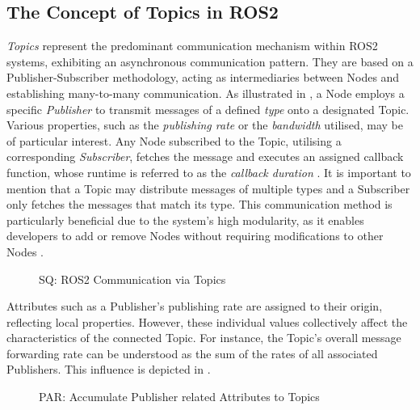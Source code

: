     \subsection{The Concept of Topics in ROS2} \label{subsec:model:topics}
        \emph{Topics} represent the predominant communication mechanism within ROS2 systems, exhibiting an asynchronous communication pattern. They are based on a Publisher-Subscriber methodology, acting as intermediaries between Nodes and establishing many-to-many communication. As illustrated in , a Node employs a specific \emph{Publisher} to transmit messages of a defined \emph{type} onto a designated Topic. Various properties, such as the \emph{publishing rate} or the \emph{bandwidth} utilised, may be of particular interest. Any Node subscribed to the Topic, utilising a corresponding \emph{Subscriber}, fetches the message and executes an assigned callback function, whose runtime is referred to as the \emph{callback duration} \cite[p.~3]{ROS2usesInTheWild}. It is important to mention that a Topic may distribute messages of multiple types and a Subscriber only fetches the messages that match its type.\newline
        This communication method is particularly beneficial due to the system's high modularity, as it enables developers to add or remove Nodes without requiring modifications to other Nodes \cite[p.~3]{ROS2usesInTheWild}.
        \begin{figure}[h]
            \centering
            
            \caption[Communication via Topics in ROS2]{SQ: ROS2 Communication via Topics} \label{fig:tikz:SQ:Topic}
        \end{figure}

        Attributes such as a Publisher's publishing rate are assigned to their origin, reflecting local properties. However, these individual values collectively affect the characteristics of the connected Topic. For instance, the Topic's overall message forwarding rate can be understood as the sum of the rates of all associated Publishers. This influence is depicted in .
        \begin{figure}[h]
            \centering
            
            \caption[Calculating a Topic's Forwarding Rate]{PAR: Accumulate Publisher related Attributes to Topics} \label{fig:tikz:PAR:Frequency}
        \end{figure}

